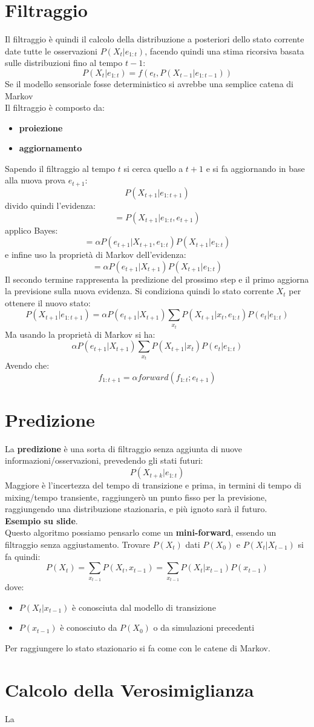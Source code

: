 \message{ !name(modprob.tex)}\documentclass[a4paper,12pt, oneside]{book}
\begin{document}
\section{Filtraggio}
Il filtraggio è quindi il calcolo della distribuzione a posteriori dello stato
corrente date tutte le osservazioni $P(X_t|e_{1:t})$, facendo quindi una stima
ricorsiva basata sulle distribuzioni fino al tempo $t-1$:
\[P(X_t|e_{1:t})=f(e_t,P(X_{t-1}|e_{1:t-1}))\]
Se il modello sensoriale fosse deterministico si avrebbe una semplice catena di
Markov\\
Il filtraggio è composto da:
\begin{itemize}
  \item \textbf{proiezione}
  \item \textbf{aggiornamento}
\end{itemize}
Sapendo il filtraggio al tempo $t$ si cerca quello a $t+1$ e si fa aggiornando
in base alla nuova prova $e_{t+1}$:
\[P(X_{t+1}|e_{1:t+1})\]
divido quindi l'evidenza:
\[=P(X_{t+1}|e_{1:t},e_{t+1})\]
applico Bayes:
\[=\alpha P(e_{t+1}|X_{t+1},e_{1:t})P(X_{t+1}|e_{1:t})\]
e infine uso la proprietà di Markov dell'evidenza:
\[=\alpha P(e_{t+1}|X_{t+1})P(X_{t+1}|e_{1:t})\]
Il secondo termine rappresenta la predizione del prossimo step e il primo
aggiorna la previsione sulla nuova evidenza. Si condiziona quindi lo stato
corrente $X_t$ per ottenere il nuovo stato:
\[P(X_{t+1}|e_{1:t+1})=\alpha
  P(e_{t+1}|X_{t+1})\sum_{x_t}P(X_{t+1}|x_t,e_{1:t})P(e_t|e_{1:t})\]
Ma usando la proprietà di Markov si ha:
\[\alpha
  P(e_{t+1}|X_{t+1})\sum_{x_t}P(X_{t+1}|x_t)P(e_t|e_{1:t})\]
Avendo che:
\[f_{1:t+1}=\alpha forward(f_{1:t};e_{t+1})\]
\section{Predizione}
La \textbf{predizione} è una sorta di filtraggio senza aggiunta di nuove
informazioni/osservazioni, prevedendo gli stati futuri:
\[P(X_{t+k}|e_{1:t})\]
Maggiore è l'incertezza del tempo di transizione e prima, in termini di tempo di
mixing/tempo transiente, raggiungerò un punto
fisso per la previsione, raggiungendo una distribuzione stazionaria, e più
ignoto sarà il futuro.\\
\textbf{Esempio su slide}.\\
Questo algoritmo possiamo pensarlo come un \textbf{mini-forward}, essendo un
filtraggio senza aggiustamento. Trovare $P(X_t)$ dati $P(X_0)$ e
$P(X_t|X_{t-1})$ si fa quindi:
\[P(X_t)=\sum_{x_{t-1}}P(X_t,x_{t-1})=\sum_{x_{t-1}}P(X_t|x_{t-1})P(x_{t-1})\]
dove:
\begin{itemize}
  \item $P(X_t|x_{t-1})$ è conosciuta dal modello di transizione
  \item $P(x_{t-1})$ è conosciuto da $P(X_0)$ o da simulazioni precedenti
\end{itemize}
Per raggiungere lo stato stazionario si fa come con le catene di Markov.
\section{Calcolo della Verosimiglianza}
La 
\end{document}

